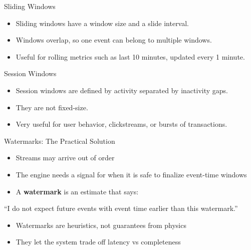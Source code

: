 \documentclass[aspectratio=169]{beamer}
\begin{document}
\begin{frame}{Sliding Windows}
\begin{center}

\end{center}

\vspace{0.2cm}
\begin{itemize}
    \item Sliding windows have a window size and a slide interval.
    \item Windows overlap, so one event can belong to multiple windows.
    \item Useful for rolling metrics such as last 10 minutes, updated every 1 minute.
\end{itemize}
\end{frame}

\begin{frame}{Session Windows}
\begin{center}

\end{center}

\vspace{0.2cm}
\begin{itemize}
    \item Session windows are defined by activity separated by inactivity gaps.
    \item They are not fixed-size.
    \item Very useful for user behavior, clickstreams, or bursts of transactions.
\end{itemize}
\end{frame}

\begin{frame}{Watermarks: The Practical Solution}
\begin{itemize}
    \item Streams may arrive out of order
    \item The engine needs a signal for when it is safe to finalize event-time windows
    \item A \textbf{watermark} is an estimate that says:
\end{itemize}

\begin{block}{}
``I do not expect future events with event time earlier than this watermark.''
\end{block}

\begin{itemize}
    \item Watermarks are heuristics, not guarantees from physics
    \item They let the system trade off latency vs completeness
\end{itemize}
\end{frame}
\end{document}
